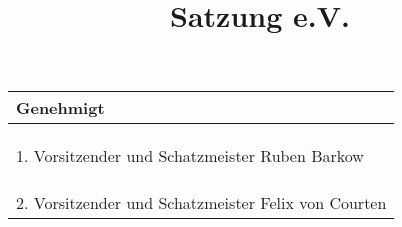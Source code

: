 \documentclass[12pt,a4paper]{article}
\title{Satzung {\Verein} e.V.}
\newcommand{\VorstandEins}{Ruben Barkow}
\newcommand{\VorstandZwei}{Felix von Courten}
\begin{document}
\pagestyle{fancy}

\begin{center}

\begin{tabular}{|p{15cm}|}
\hline 
Genehmigt \\ 
\hline 
 \\
 \\
 \\
\hline 
1. Vorsitzender und Schatzmeister \VorstandEins \\ 
\hline 
 \\
 \\
 \\
\hline 
2. Vorsitzender und Schatzmeister \VorstandZwei \\
\hline
\end{tabular} 

\end{center}
\end{document}
